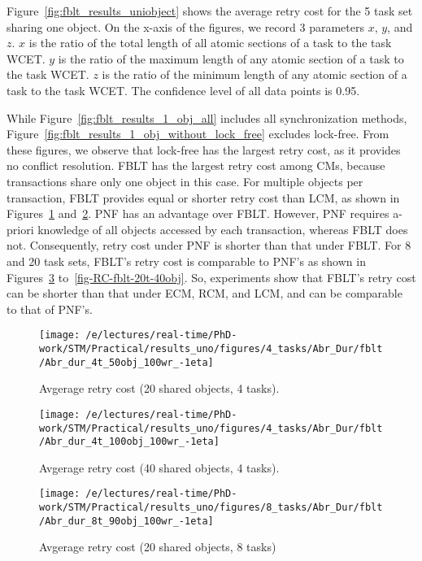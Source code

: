 \documentclass[conference]{IEEEtran}
\begin{document}
Figure~\ref{fig:fblt_results_uniobject} shows the average retry cost for the 5 task set sharing one object. On the x-axis of the figures, we record 3 parameters $x$, $y$, and $z$. $x$ is the ratio of the total length of all atomic sections of a task to the task WCET. $y$ is the ratio of the maximum length of any atomic section of a task to the task WCET. $z$ is the ratio of the minimum length of any atomic section of a task to the task WCET. The confidence level of all data points is 0.95.
 
While Figure~\ref{fig:fblt_results_1_obj_all} includes all synchronization methods, Figure~\ref{fig:fblt_results_1_obj_without_lock_free} excludes lock-free. From these figures, we observe that lock-free has the largest retry cost, as it provides no conflict resolution. FBLT has the largest retry cost among CMs,  because transactions share only one object in this case. For multiple objects per transaction, FBLT provides equal or shorter retry cost than LCM, as shown in Figures~\ref{fig-RC-fblt-4t-20obj} and~\ref{fig-RC-fblt-4t-40obj}. PNF has an advantage over FBLT. However, PNF requires a-priori knowledge of all objects accessed by each transaction, whereas FBLT does not. Consequently, retry cost under PNF is shorter than that under FBLT. For 8 and 20 task sets, FBLT's retry cost is comparable to PNF's as shown in Figures~\ref{fig-RC-fblt-8t-20obj} to~\ref{fig-RC-fblt-20t-40obj}. So, experiments show that FBLT's retry cost can be shorter than that under ECM, RCM, and LCM, and can be comparable to that of PNF's.


\begin{figure}
\centering
\texttt{[image: /e/lectures/real-time/PhD-work/STM/Practical/results\_uno/figures/4\_tasks/Abr\_Dur/fblt/Abr\_dur\_4t\_50obj\_100wr\_-1eta]}
\caption{Avgerage retry cost (20 shared objects, 4 tasks).}
\label{fig-RC-fblt-4t-20obj}
\end{figure}

\begin{figure}
\centering
\texttt{[image: /e/lectures/real-time/PhD-work/STM/Practical/results\_uno/figures/4\_tasks/Abr\_Dur/fblt/Abr\_dur\_4t\_100obj\_100wr\_-1eta]}
\caption{Avgerage retry cost (40 shared objects, 4 tasks).}
\label{fig-RC-fblt-4t-40obj}
\end{figure}

\begin{figure}
\centering
\texttt{[image: /e/lectures/real-time/PhD-work/STM/Practical/results\_uno/figures/8\_tasks/Abr\_Dur/fblt/Abr\_dur\_8t\_90obj\_100wr\_-1eta]}
\caption{Avgerage retry cost (20 shared objects, 8 tasks)}
\label{fig-RC-fblt-8t-20obj}
\end{figure}
\end{document}
